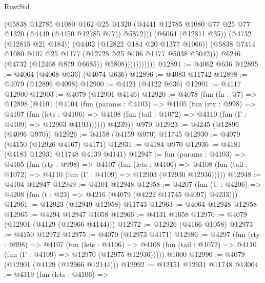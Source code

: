 \begin{lexlean}{RustStd}
\begin{coremodule}
{\begin{coremodule}
{{{{{{{{{{{{{{                              (@5838
                                @12785
                                @1080
                                @162
                                @25
                                @1320
                                (@4441
                                  @12785
                                  @1080
                                  @77
                                  @25
                                  @77
                                  @1320
                                  (@4449 (@4450 @12785 @77))
                                  @5872)))
                            (@6064 (@12811 @35))
                            (@4732 (@12815 @21 @184))
                            (@4402 (@12822 @184 @20 @1377 @1066))
                            (@5838 @7414 @1080 @107 @25 @1177 (@12728 @25 @106 @1177 @5038 @5042)))
                          @6246
                          (@4732 (@12468 @879 @6685))
                          @5808)))))))))))
@12891 := @4062 @636
@12895 := @4064 (@4068 @636) (@4074 @636)
@12896 := @4083 @11742
@12898 := @4079 (@12896 @4098)
@12900 := @4121 (@4122 @636)
@12901 := @4117 @12900
@12903 := @4079 (@12901 @4146)
@12920 := @4078
    (fun (fn : @7) =>
    @12898
      (@4101
        (@4104
          (fun (params : @4103) =>
          @4105
            (fun (rty : @998) =>
            @4107
              (fun (lets : @4106) =>
              @4108 (fun (tail : @1072) => @4110 (fun (Γ : @4109) => @12903 @4193))))))
        @4239))
    @970
@12923 := @4245 (@12896 (@4096 @970))
@12926 := @4158 (@4159 @970) @11745
@12930 := @4079 (@4150 (@12926 @4167) @4171)
@12931 := @4184 @970
@12936 := @4181 (@4183 @12931 @11748 @4139 @4141)
@12947 := fun (params : @4103) =>
  @4105
    (fun (rty : @998) =>
    @4107
      (fun (lets : @4106) =>
      @4108 (fun (tail : @1072) => @4110 (fun (Γ : @4109) => @12903 (@12930 @12936)))))
@12948 := @4104 @12947
@12949 := @4101 @12948
@12958 := @4207
    (fun (U : @4206) => @4208 (fun (t : @23) => @4216 (@4079 (@4222 @11745 @4097) @4233)))
@12961 := @12923 (@12949 @12958) @11743
@12963 := @4064 @12948 @12958
@12965 := @4294 @12947 @1058
@12966 := @4131 @1058
@12970 := @4079 (@12901 (@4129 (@12966 @4144)))
@12972 := @12926 (@4166 @1058)
@12973 := @4150 @12972
@12975 := @4079 (@12973 @4171)
@12986 := @4297
    (fun (rty : @998) =>
    @4107
      (fun (lets : @4106) =>
      @4108 (fun (tail : @1072) => @4110 (fun (Γ : @4109) => @12970 (@12975 @12936)))))
    @1000
@12990 := @4079 (@12901 (@4129 (@12966 @12144)))
@12992 := @12151 @12931 @11748
@13004 := @4319
    (fun (lets : @4106) =>
}}}}}}}}}}}}}}
\end{coremodule}}
\end{coremodule}
\end{lexlean}
